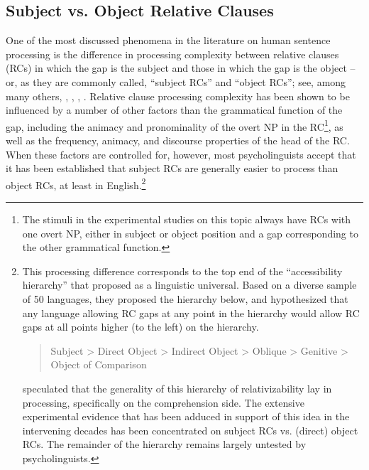 \documentclass[a4paper]{article}
\begin{document}
\subsection{Subject vs. Object Relative Clauses}

One of the most discussed phenomena in the literature on human sentence processing is the difference in processing complexity between relative clauses (RCs) in which the gap is the subject and those in which the gap is the object -- or, as they are commonly called, ``subject RCs'' and ``object RCs''; see, among many others, \citet{WannerMaratsos78}, \citet{Gibson98a}, \citet{TraxlerEtal2002}, \citet{GennariMacDonald2008}.  Relative clause processing complexity has been shown to be influenced by a number of other factors than the grammatical function of the gap, including the animacy and pronominality of the overt NP in the RC\footnote{The stimuli in the experimental studies on this topic always have RCs with one overt NP, either in subject or object position and a gap corresponding to the other grammatical function.}, as well as the frequency, animacy, and discourse properties of the head of the RC.  When these factors are controlled for, however, most psycholinguists accept that it has been established that subject RCs are generally easier to process than object RCs, at least in English.\footnote{This processing difference corresponds to the top end of the ``accessibility hierarchy'' that \citet{KC77a} proposed as a linguistic universal. Based on a diverse sample of 50 languages, they proposed the hierarchy below, and hypothesized that any language allowing RC gaps at any point in the hierarchy would allow RC gaps at all points higher (to the left) on the hierarchy.
\begin{quote}

Subject 
> 
Direct Object 
> 
Indirect Object 
> 
Oblique 
> 
Genitive
> 
Object of Comparison
\end{quote}
\citeauthor{KC77a} speculated that the generality of this hierarchy of relativizability lay in processing, specifically on the comprehension side.  The extensive experimental evidence that has been adduced in support of this idea in the intervening decades has been concentrated on subject RCs vs. (direct) object RCs.  The remainder of the hierarchy remains largely untested by psycholinguists.}
\end{document}

